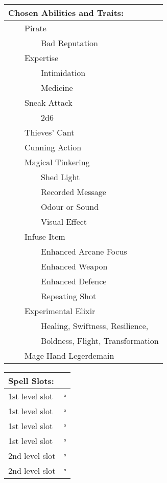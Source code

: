 \documentclass[11pt]{article}
\newcommand{\available}{$\square$}
\newcommand{\tabitem}{~~\llap{--}~~}
\newcommand{\tabtabitem}{~~~~~~\llap{$\bullet$}~~}
\begin{document}
\begin{multicols}{2}
\vspace{4mm}

\noindent \begin{tabularx}{\linewidth}{@{}l}
{\Large \textbf{Chosen Abilities and Traits:}} \\
\hline
\tabitem Pirate \\
\tabtabitem Bad Reputation \\
\tabitem Expertise \\
\tabtabitem Intimidation \\
\tabtabitem Medicine \\
\tabitem Sneak Attack \\
\tabtabitem 2d6 \\
\tabitem Thieves' Cant \\
\tabitem Cunning Action \\
\tabitem Magical Tinkering \\
\tabtabitem Shed Light \\
\tabtabitem Recorded Message \\
\tabtabitem Odour or Sound \\
\tabtabitem Visual Effect \\
\tabitem Infuse Item \\
\tabtabitem Enhanced Arcane Focus \\
\tabtabitem Enhanced Weapon \\
\tabtabitem Enhanced Defence \\
\tabtabitem Repeating Shot \\
\tabitem Experimental Elixir \\
\tabtabitem Healing, Swiftness, Resilience, \\
\tabtabitem Boldness, Flight, Transformation \\
\tabitem Mage Hand Legerdemain
		\end{tabularx}

\vspace{4mm}

\noindent \begin{tabularx}{\linewidth}{@{}l c}
{\Large \textbf{Spell Slots:}} \\
\hline
1st level slot & \available \\
1st level slot & \available \\
1st level slot & \available \\
1st level slot & \available \\
2nd level slot & \available \\
2nd level slot & \available
		\end{tabularx}


\end{multicols}
\end{document}

